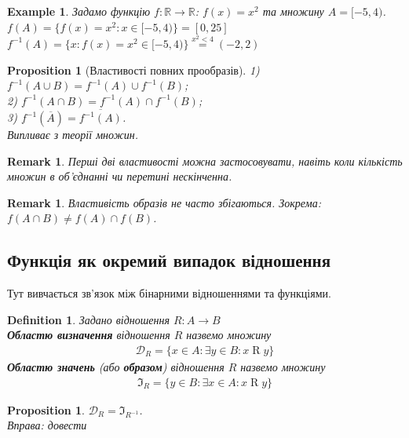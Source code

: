 \documentclass[a4paper, 14pt]{extarticle}
\theoremstyle{theoremdd}
\theoremstyle{theoremdd}
\newtheorem{definition}[theorem]{Definition}
\theoremstyle{theoremdd}
\theoremstyle{theoremdd}
\theoremstyle{theoremdd}
\newtheorem{example}[theorem]{Example}
\theoremstyle{theoremdd}
\theoremstyle{theoremdd}
\theoremstyle{theoremdd}
\theoremstyle{theoremdd}
\newtheorem{proposition}[theorem]{Proposition}
\theoremstyle{theoremdd}
\theoremstyle{theoremdd}
\newtheorem{remark}[theorem]{Remark}
\theoremstyle{theoremdd}
\theoremstyle{theoremdd}
\theoremstyle{theoremdd}
\theoremstyle{theoremdd}
\begin{document}
	\begin{example} Задамо функцію $f \colon \mathbb{R} \to \mathbb{R}$: \quad $f(x) = x^2$ та множину $A = [-5, 4)$.\\
	$f(A) = \{f(x) = x^2: x \in [-5, 4) \} = [0, 25]$\\
	$f^{-1}(A) = \{x: f(x) = x^2 \in [-5, 4) \} \overset{x^2 < 4}{=} (-2, 2)$
	\end{example}

	\begin{proposition}[Властивості повних прообразів]
	1) $f^{-1}(A \cup B) = f^{-1}(A) \cup f^{-1}(B)$;\\
	2) $f^{-1}(A \cap B) = f^{-1}(A) \cap f^{-1}(B)$;\\
	3) $f^{-1}(\overline{A}) = \overline{f^{-1}(A)}$.\\
	\textit{Випливає з теорії множин.}
	\end{proposition}
	
	\begin{remark}
	Перші дві властивості можна застосовувати, навіть коли кількість множин в об'єднанні чи перетині нескінченна.
	\end{remark}
	
	\begin{remark}
	Властивість образів не часто збігаються. Зокрема: $f(A \cap B) \neq f(A) \cap f(B)$.
	\end{remark}

\subsection{Функція як окремий випадок відношення}
Тут вивчається зв'язок між бінарними відношеннями та функціями.
\begin{definition} 
Задано відношення $R \colon A \to B$\\
\textbf{Областю визначення} відношення $R$ назвемо множину
\begin{align*}
\mathcal{D}_R = \{x \in A: \exists y \in B: x \mathrel{R} y\}
\end{align*}
\textbf{Областю значень} (або \textbf{образом}) відношення $R$ назвемо множину
\begin{align*}
\Im_R = \{y \in B: \exists x \in A: x \mathrel{R} y\}
\end{align*}
\end{definition}

\begin{proposition}
$\mathcal{D}_R = \Im_{R^{-1}}$.\\
\textit{Вправа: довести}
\end{proposition}
\end{document}
